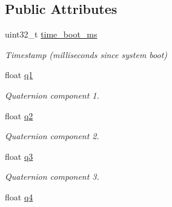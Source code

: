 \subsection*{Public Attributes}
\begin{DoxyCompactItemize}
\item 
\hypertarget{struct____mavlink__attitude__quaternion__t_af6846c94b303788cf54d7861a939ab15}{uint32\+\_\+t \hyperlink{struct____mavlink__attitude__quaternion__t_af6846c94b303788cf54d7861a939ab15}{time\+\_\+boot\+\_\+ms}}\label{struct____mavlink__attitude__quaternion__t_af6846c94b303788cf54d7861a939ab15}

\begin{DoxyCompactList}\small\item\em Timestamp (milliseconds since system boot) \end{DoxyCompactList}\item 
\hypertarget{struct____mavlink__attitude__quaternion__t_a54fd7b1cca2ab5e1b800bef5c7014b17}{float \hyperlink{struct____mavlink__attitude__quaternion__t_a54fd7b1cca2ab5e1b800bef5c7014b17}{q1}}\label{struct____mavlink__attitude__quaternion__t_a54fd7b1cca2ab5e1b800bef5c7014b17}

\begin{DoxyCompactList}\small\item\em Quaternion component 1. \end{DoxyCompactList}\item 
\hypertarget{struct____mavlink__attitude__quaternion__t_ad6451d99fa8f80bba96a47b3c2408255}{float \hyperlink{struct____mavlink__attitude__quaternion__t_ad6451d99fa8f80bba96a47b3c2408255}{q2}}\label{struct____mavlink__attitude__quaternion__t_ad6451d99fa8f80bba96a47b3c2408255}

\begin{DoxyCompactList}\small\item\em Quaternion component 2. \end{DoxyCompactList}\item 
\hypertarget{struct____mavlink__attitude__quaternion__t_a6ea5423090526626cf04041c929703d5}{float \hyperlink{struct____mavlink__attitude__quaternion__t_a6ea5423090526626cf04041c929703d5}{q3}}\label{struct____mavlink__attitude__quaternion__t_a6ea5423090526626cf04041c929703d5}

\begin{DoxyCompactList}\small\item\em Quaternion component 3. \end{DoxyCompactList}\item 
\hypertarget{struct____mavlink__attitude__quaternion__t_a4c78a9e744406f980fab7ff67613b14d}{float \hyperlink{struct____mavlink__attitude__quaternion__t_a4c78a9e744406f980fab7ff67613b14d}{q4}}\label{struct____mavlink__attitude__quaternion__t_a4c78a9e744406f980fab7ff67613b14d}


\end{DoxyCompactItemize}
